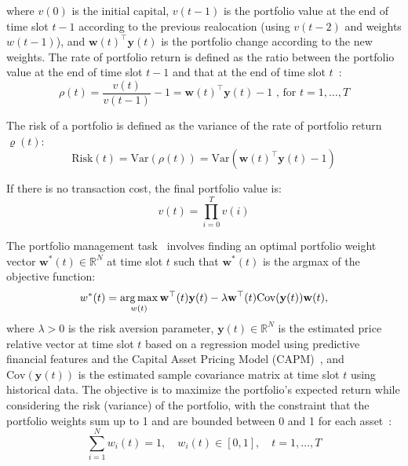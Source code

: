 \documentclass[../xlapes02]{subfiles}
\begin{document}
    where $v(0)$ is the initial capital, $v(t-1)$ is the portfolio value at the end of time slot $t-1$ according to the previous realocation (using $v(t-2)$ and weights $w(t-1)$), and $\mathbf{w}(t)^\top\mathbf{y}(t)$ is the portfolio change according to the new weights. The rate of portfolio return is defined as the ratio between the portfolio value at the end of time slot $t-1$ and that at the end of time slot $t$~\cite{finrl-portfolio-allocation-2020}:
    \begin{equation}
        \rho(t)=\frac{v(t)}{v(t-1)}-1=\mathbf{w}(t)^\top\mathbf{y}(t)-1\text{ , for }t=1,\ldots,T\label{eq:equation3}
    \end{equation}

    The risk of a portfolio is defined as the variance of the rate of portfolio return $\varrho(t)$:
    \begin{equation}
        \text{Risk}(t)=\text{Var}(\rho(t))=\text{Var}(\mathbf{w}(t)^\top \mathbf{y}(t) - 1)\label{eq:equation3}
    \end{equation}

    If there is no transaction cost, the final portfolio value is:
    \begin{equation}
        \label{eq:portfolio-value}
        v(t) = \prod_{i=0}^{T} v(i)
    \end{equation}

    The portfolio management task~\cite{enwiki:1043516653} involves finding an optimal portfolio weight vector $\mathbf{w}^*(t) \in \mathbb{R}^N$ at time slot $t$ such that $\mathbf{w}^*(t)$ is the argmax of the objective function:
    \begin{equation}
        w^*(t)=\operatorname*{arg\,max}_{w(t)}\mathbf{w}^\top(t)\mathbf{y}(t)-\lambda\mathbf{w}^\top(t)\text{Cov}(\mathbf{y}(t))\mathbf{w}(t),\label{eq:equation2}
    \end{equation}
    where $\lambda > 0$ is the risk aversion parameter, $\mathbf{y}(t) \in \mathbb{R}^N$ is the estimated price relative vector at time slot $t$ based on a regression model using predictive financial features and the Capital Asset Pricing Model (CAPM)~\cite{fama-2004}, and $\text{Cov}(\mathbf{y}(t))$ is the estimated sample covariance matrix at time slot $t$ using historical data. The objective is to maximize the portfolio's expected return while considering the risk (variance) of the portfolio, with the constraint that the portfolio weights sum up to 1 and are bounded between 0 and 1 for each asset~\cite{finrl-portfolio-allocation-2020}:
    \begin{equation}
        \sum_{i=1}^{N}w_i(t)=1,\quad w_i(t)\in[0,1],\quad t=1,\ldots,T\label{eq:equation2}
    \end{equation}
\end{document}
